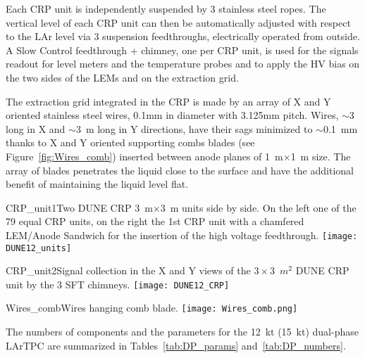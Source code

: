 Each CRP unit is independently suspended by 3 stainless steel
ropes. The vertical level of each CRP unit can then be automatically
adjusted with respect to the LAr level via 3 suspension feedthroughs,
electrically operated from outside. A Slow Control feedthrough +
chimney, one per CRP unit, is used for the signals readout for level
meters and the temperature probes and to apply the HV bias on the two
sides of the LEMs and on the extraction grid.

The extraction grid integrated in the CRP is made by an array of X and
Y oriented stainless steel wires, 0.1mm in diameter with 3.125mm
pitch.  Wires, $\sim$3 long in X and $\sim$3~m long in Y directions, have their
sags minimized to $\sim$0.1~mm thanks to X and Y oriented supporting combs
blades (see Figure~\ref{fig:Wires_comb}) inserted between anode planes of
1~m$\times$1~m size. The array of blades penetrates the liquid close
to the surface and have the additional benefit of maintaining the
liquid level flat.

\begin{cdrfigure}{CRP_unit1}{Two DUNE CRP 3~m$\times$3~m units side by side. On the left one of the 79 equal CRP units, on the right the 1st CRP unit with a chamfered LEM/Anode Sandwich for the insertion of the high voltage feedthrough.}
\texttt{[image: DUNE12\_units]}
\end{cdrfigure}

\begin{cdrfigure}{CRP_unit2}{Signal collection in the X and Y views of the  $3\times3$~$m^2$ DUNE CRP unit by the 3 SFT chimneys.}
\texttt{[image: DUNE12\_CRP]}
\end{cdrfigure}

\begin{cdrfigure}{Wires_comb}{Wires hanging comb blade.}
\texttt{[image: Wires\_comb.png]}
\end{cdrfigure}

The numbers of components and the parameters for the 12~kt (15~kt)
dual-phase LArTPC are summarized in Tables~\ref{tab:DP_params}
and~\ref{tab:DP_numbers}.

